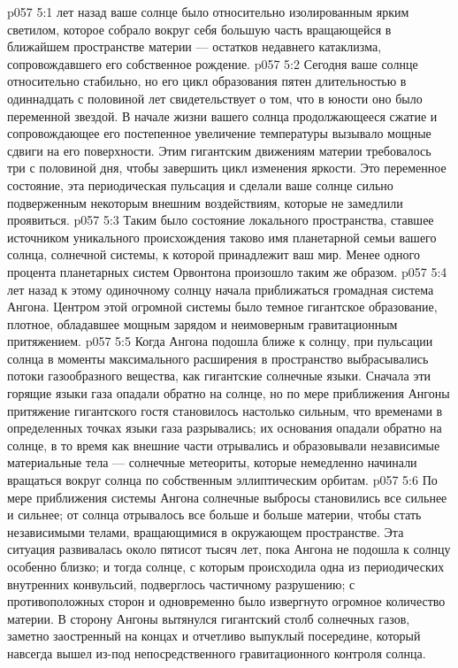 \vs p057 5:1  лет назад ваше солнце было относительно изолированным ярким светилом, которое собрало вокруг себя большую часть вращающейся в ближайшем пространстве материи --- остатков недавнего катаклизма, сопровождавшего его собственное рождение.
\vs p057 5:2 Сегодня ваше солнце относительно стабильно, но его цикл образования пятен длительностью в одиннадцать с половиной лет свидетельствует о том, что в юности оно было переменной звездой. В начале жизни вашего солнца продолжающееся сжатие и сопровождающее его постепенное увеличение температуры вызывало мощные сдвиги на его поверхности. Этим гигантским движениям материи требовалось три с половиной дня, чтобы завершить цикл изменения яркости. Это переменное состояние, эта периодическая пульсация и сделали ваше солнце сильно подверженным некоторым внешним воздействиям, которые не замедлили проявиться.
\vs p057 5:3 Таким было состояние локального пространства, ставшее источником уникального происхождения  таково имя планетарной семьи вашего солнца, солнечной системы, к которой принадлежит ваш мир. Менее одного процента планетарных систем Орвонтона произошло таким же образом.
\vs p057 5:4 \pc {} лет назад к этому одиночному солнцу начала приближаться громадная система Ангона. Центром этой огромной системы было темное гигантское образование, плотное, обладавшее мощным зарядом и неимоверным гравитационным притяжением.
\vs p057 5:5 Когда Ангона подошла ближе к солнцу, при пульсации солнца в моменты максимального расширения в пространство выбрасывались потоки газообразного вещества, как гигантские солнечные языки. Сначала эти горящие языки газа опадали обратно на солнце, но по мере приближения Ангоны притяжение гигантского гостя становилось настолько сильным, что временами в определенных точках языки газа разрывались; их основания опадали обратно на солнце, в то время как внешние части отрывались и образовывали независимые материальные тела --- солнечные метеориты, которые немедленно начинали вращаться вокруг солнца по собственным эллиптическим орбитам.
\vs p057 5:6 По мере приближения системы Ангона солнечные выбросы становились все сильнее и сильнее; от солнца отрывалось все больше и больше материи, чтобы стать независимыми телами, вращающимися в окружающем пространстве. Эта ситуация развивалась около пятисот тысяч лет, пока Ангона не подошла к солнцу особенно близко; и тогда солнце, с которым происходила одна из периодических внутренних конвульсий, подверглось частичному разрушению; с противоположных сторон и одновременно было извергнуто огромное количество материи. В сторону Ангоны вытянулся гигантский столб солнечных газов, заметно заостренный на концах и отчетливо выпуклый посередине, который навсегда вышел из\hyp{}под непосредственного гравитационного контроля солнца.

